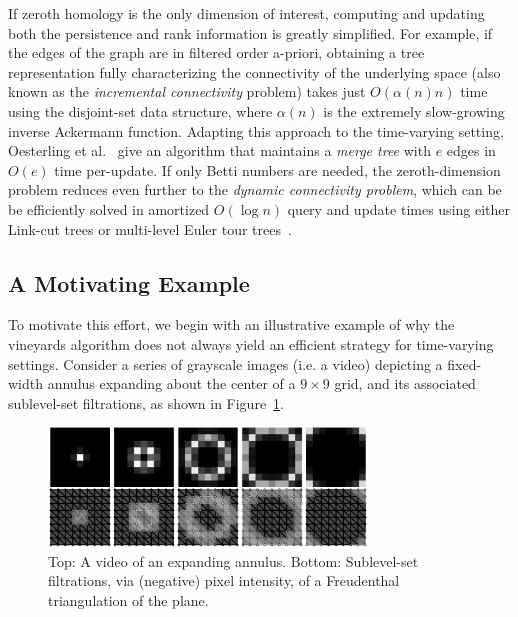 \documentclass[sn-mathphys]{sn-jnl}
\begin{document}
If  zeroth homology  is the only dimension of interest, computing and updating both the persistence and rank information  is greatly simplified. For example, if the edges of the graph are in filtered order a-priori, obtaining a tree representation fully characterizing the connectivity of the underlying space (also known as the \emph{incremental connectivity} problem) takes just $O(\alpha(n) n)$ time using the disjoint-set data structure, where $\alpha(n)$ is the extremely slow-growing inverse Ackermann function. 
Adapting this approach to the time-varying setting, Oesterling et al.~\cite{oesterling2015computing} give an algorithm that maintains a \emph{merge tree} with $e$ edges in $O(e)$ time per-update.
If only Betti numbers are needed, the zeroth-dimension problem reduces even further to the \emph{dynamic connectivity problem}, which can be be efficiently solved in amortized $O(\log n)$ query and update times using either Link-cut trees or multi-level Euler tour trees~\cite{kapron2013dynamic}.
  
\subsection{A Motivating Example}\label{sec:motivation} 
To motivate this effort, we begin with an illustrative example of why the vineyards algorithm does not always yield an efficient strategy for time-varying settings. 
Consider a series of grayscale images (i.e. a video) depicting a fixed-width annulus expanding about the center of a $9 \times 9$ grid, and its associated sublevel-set filtrations, as shown in Figure~\ref{fig:vidExample}.   

\begin{figure}[!htb]
    \centering
    \includegraphics[height=1.25in]{circle_complex.png}
    \caption{Top: A video of an expanding annulus. Bottom: Sublevel-set filtrations, via (negative) pixel intensity, of a Freudenthal triangulation of the plane.}
    \label{fig:vidExample}
\end{figure}
\end{document}
